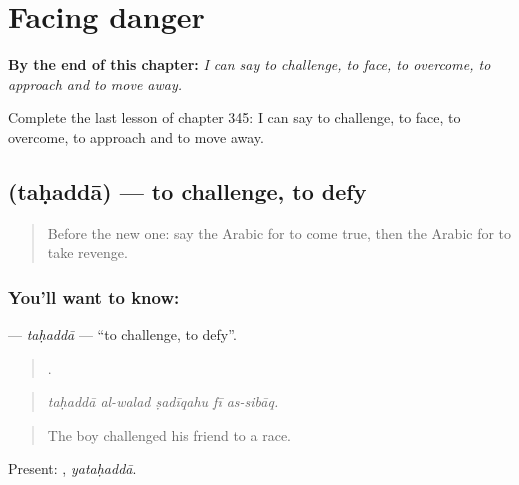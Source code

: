 
\chapter{Facing danger}
\label{ch:ar-facing-danger}

\begin{chapteropening}
\textbf{By the end of this chapter:} \emph{I can say to challenge, to face, to overcome, to approach and to move away.}

Complete the last lesson of chapter 345: I can say to challenge, to face, to overcome, to approach and to move away.
\end{chapteropening}

\section[\texorpdfstring{\ar{تحدى} (taḥaddā)}{تحدى (taḥaddā)}]{ (taḥaddā) — to challenge, to defy}

\label{lesson:AR-C345-tahadda}



\begin{quote}
Before the new one: say the Arabic for to come true, then the Arabic for to take revenge.
\end{quote}

\subsection*{You'll want to know: }
\textbf{} — \emph{taḥaddā} — \textquotedblleft{}to challenge, to defy\textquotedblright{}.

\begin{quote}
    .
\end{quote}

\begin{quote}
\emph{taḥaddā al-walad ṣadīqahu fī as-sibāq.}
\end{quote}

\begin{quote}
The boy challenged his friend to a race.
\end{quote}

Present: , \emph{yataḥaddā}.

